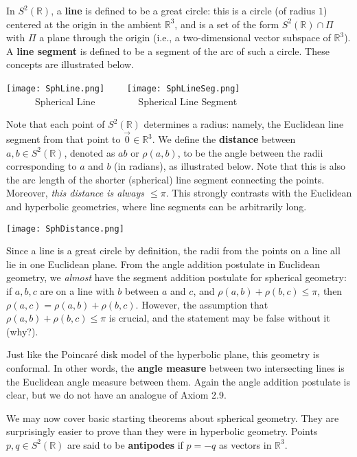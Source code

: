 \documentclass[leqno]{book}
\begin{document}
In $S^2(\mathbb R)$, a \textbf{line} is defined to be a great circle: this is a circle (of radius $1$) centered at the origin in the ambient $\mathbb R^3$, and is a set of the form $S^2(\mathbb R)\cap\Pi$ with $\Pi$ a plane through the origin (i.e., a two-dimensional vector subspace of $\mathbb R^3$).  A \textbf{line segment} is defined to be a segment of the arc of such a circle.  These concepts are illustrated below.
\begin{center}
\texttt{[image: SphLine.png]}~~~~
\texttt{[image: SphLineSeg.png]}\\
~~~~~~Spherical Line~~~~~~~~~Spherical Line Segment
\end{center}
Note that each point of $S^2(\mathbb R)$ determines a radius: namely, the Euclidean line segment from that point to $\vec 0\in\mathbb R^3$.  We define the \textbf{distance} between $a,b\in S^2(\mathbb R)$, denoted as $ab$ or $\rho(a,b)$, to be the angle between the radii corresponding to $a$ and $b$ (in radians), as illustrated below.  Note that this is also the arc length of the shorter (spherical) line segment connecting the points.  Moreover, \emph{this distance is always $\leqslant\pi$}.  This strongly contrasts with the Euclidean and hyperbolic geometries, where line segments can be arbitrarily long.
\begin{center}
\texttt{[image: SphDistance.png]}
\end{center}
Since a line is a great circle by definition, the radii from the points on a line all lie in one Euclidean plane.  From the angle addition postulate in Euclidean geometry, we \emph{almost} have the segment addition postulate for spherical geometry: if $a,b,c$ are on a line with $b$ between $a$ and $c$, and $\rho(a,b)+\rho(b,c)\leqslant\pi$, then $\rho(a,c)=\rho(a,b)+\rho(b,c)$.  However, the assumption that $\rho(a,b)+\rho(b,c)\leqslant\pi$ is crucial, and the statement may be false without it (why?).

Just like the Poincar\'e disk model of the hyperbolic plane, this geometry is conformal.  In other words, the \textbf{angle measure} between two intersecting lines is the Euclidean angle measure between them.  Again the angle addition postulate is clear, but we do not have an analogue of Axiom 2.9.

We may now cover basic starting theorems about spherical geometry.  They are surprisingly easier to prove than they were in hyperbolic geometry.  Points $p,q\in S^2(\mathbb R)$ are said to be \textbf{antipodes} if $p=-q$ as vectors in $\mathbb R^3$.\\
\end{document}
